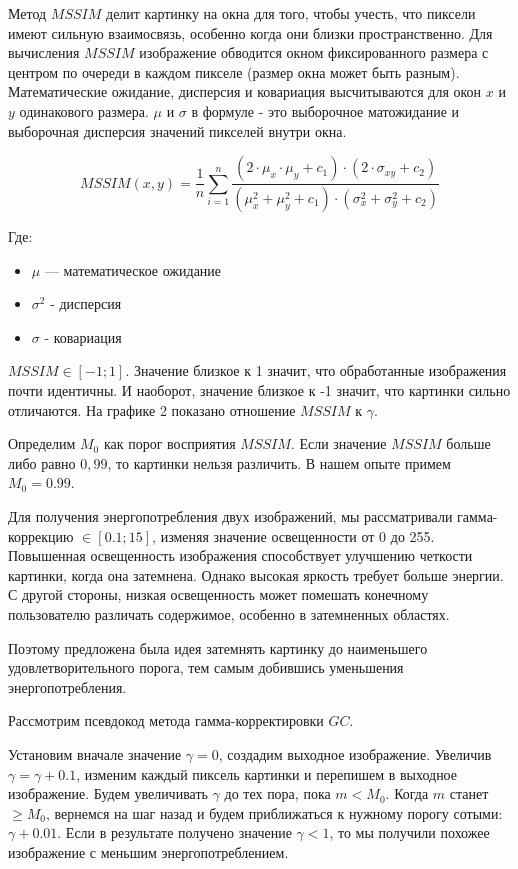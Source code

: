 \documentclass[a4paper, 12pt]{article}
\begin{document}
	Метод $MSSIM$ делит картинку на окна для того, чтобы учесть, что пиксели имеют сильную взаимосвязь, особенно когда они близки пространственно. Для вычисления $MSSIM$ изображение обводится окном фиксированного размера с центром по очереди в каждом пикселе (размер окна может быть разным). Математические ожидание, дисперсия и ковариация высчитываются для окон $x$ и $y$ одинакового размера. $\mu$ и $\sigma$ в формуле - это выборочное матожидание и выборочная дисперсия значений пикселей внутри окна.

	
	\[MSSIM(x, y)=\frac{1}{n}\sum_{i=1}^n \frac{(2\cdot \mu_{x}\cdot \mu_{y}+c_1)\cdot (2\cdot \sigma_{x y}+c_2)}{(\mu_{x}^2+\mu_{y}^2+c_1)\cdot (\sigma_{x}^2+\sigma_{y}^2+c_2)}\]
	
	Где:
	\begin{itemize}
	    \item $\mu$ — математическое ожидание
	    \item $\sigma^2$ - дисперсия
	    \item $\sigma$ - ковариация
	\end{itemize}
	
	$MSSIM \in [-1;1]$. Значение близкое к 1 значит, что обработанные изображения почти идентичны. И наоборот, значение близкое к -1 значит, что картинки сильно отличаются. На графике 2 показано отношение $MSSIM$ к $\gamma$.
	
	Определим $M_0$ как порог восприятия $MSSIM$. Если значение $MSSIM$ больше либо равно $0,99$, то картинки нельзя различить. В нашем опыте примем $M_0 = 0.99$. 
	
	Для получения энергопотребления двух изображений, мы рассматривали гамма-коррекцию $\in [0.1;15]$, изменяя значение освещенности от 0 до 255. Повышенная освещенность изображения способствует улучшению четкости картинки, когда она затемнена. Однако высокая яркость требует больше энергии. С другой стороны, низкая освещенность может помешать конечному пользователю различать содержимое, особенно в затемненных областях.
	
	Поэтому предложена была идея затемнять картинку до наименьшего удовлетворительного порога, тем самым добившись уменьшения энергопотребления.
	
	Рассмотрим псевдокод метода гамма-корректировки $GC$.
	
	Установим вначале значение $\gamma=0$, создадим выходное изображение. Увеличив $\gamma=\gamma+0.1$, изменим каждый пиксель картинки и перепишем в  выходное изображение. Будем увеличивать $\gamma$ до тех пора, пока $m < M_0$. Когда $m$ станет $\geq M_0$, вернемся на шаг назад и будем приближаться к нужному порогу сотыми: $\gamma+0.01$. Если в результате получено значение $\gamma < 1$, то мы получили похожее 	изображение с меньшим энергопотреблением. 
	
\end{document}
